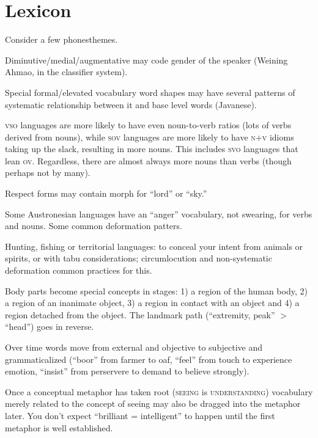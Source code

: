 \documentclass[11pt]{article}
\newcommand{\I}[1]{\textsc{#1}}   %
\begin{document}
\section{Lexicon}
Consider a few phonesthemes.

Diminutive/medial/augmentative may code gender of the speaker (Weining
Ahmao, in the classifier system).

Special formal/elevated vocabulary word shapes may have several
patterns of systematic relationship between it and base level words
(Javanese).

\I{vso} languages are more likely to have even noun-to-verb ratios
(lots of verbs derived from nouns), while \I{sov} languages are more
likely to have \I{n+v} idioms taking up the slack, resulting in more
nouns.  This includes \I{svo} languages that lean \I{ov}.  Regardless,
there are almost always more nouns than verbs (though perhaps not by
many).

Respect forms may contain morph for ``lord'' or ``sky.''

Some Austronesian languages have an ``anger'' vocabulary, not
swearing, for verbs and nouns.  Some common deformation patters.

Hunting, fishing or territorial languages: to conceal your intent from
animals or spirits, or with tabu considerations; circumlocution and
non-systematic deformation common practices for this.

Body parts become special concepts in stages: 1) a region of the human
body, 2) a region of an inanimate object, 3) a region in contact with
an object and 4) a region detached from the object.  The landmark path
(``extremity, peak'' $>$ ``head'') goes in reverse.

Over time words move from external and objective to subjective and
grammaticalized (``boor'' from farmer to oaf, ``feel'' from touch to
experience emotion, ``insist'' from perservere to demand to believe
strongly).

Once a conceptual metaphor has taken root (\I{seeing} is
\I{understanding}) vocabulary merely related to the concept of seeing
may also be dragged into the metaphor later.  You don't expect
``brilliant = intelligent'' to happen until the first metaphor is well
established.
\end{document}
